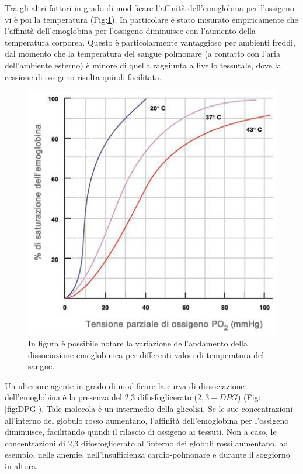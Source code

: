 \documentclass[12pt,a4paper, twoside, openright]{report}
\begin{document}
Tra gli altri fattori in grado di modificare l'affinità dell'emoglobina per l'ossigeno vi è poi la temperatura (Fig:\ref{fig:T}). 
In particolare è stato misurato empiricamente che l'affinità dell'emoglobina per l'ossigeno diminuisce con l'aumento della temperatura corporea. 
Questo è particolarmente vantaggioso per ambienti freddi, dal momento che la temperatura del sangue polmonare (a contatto con l'aria dell'ambiente esterno) è minore di quella raggiunta a livello tessutale, dove la cessione di ossigeno risulta quindi facilitata.
\begin{figure}[h!]
    \centering
    \includegraphics[width=\textwidth]{emoglobina-temperatura.jpeg}
    \caption{In figura è possibile notare la variazione dell'andamento della dissociazione emoglobinica per differenti valori di temperatura del sangue.}
    \label{fig:T}
\end{figure}
Un ulteriore agente in grado di modificare la curva di dissociazione dell'emoglobina è la presenza del 2,3 difosfoglicerato ($2,3-DPG$) (Fig:\ref{fig:DPG}). 
Tale molecola è un intermedio della glicolisi. 
Se le sue concentrazioni all'interno del globulo rosso aumentano, l'affinità dell'emoglobina per l'ossigeno diminuisce, facilitando quindi il rilascio di ossigeno ai tessuti. 
Non a caso, le concentrazioni di 2,3 difosfoglicerato all'interno dei globuli rossi aumentano, ad esempio, nelle anemie, nell'insufficienza cardio-polmonare e durante il soggiorno in altura. 
\end{document}
